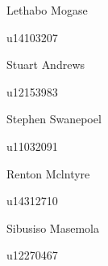 \documentclass[hidelinks,a4paper,12pt]{article}
\begin{document}
\begin{titlepage}
\begin{center}
				\begin{minipage}{0.4\textwidth}
					\begin{flushleft} \large
						Lethabo {Mogase}
					\end{flushleft}
				\end{minipage}
				\begin{minipage}{0.4\textwidth}
					\begin{flushright} \large
						\emph{}
						u14103207
					\end{flushright}
				\end{minipage}
				
				\begin{minipage}{0.4\textwidth}
					\begin{flushleft} \large
						Stuart {Andrews}
					\end{flushleft}
				\end{minipage}
				\begin{minipage}{0.4\textwidth}
					\begin{flushright} \large
						\emph{}
						u12153983
					\end{flushright}
				\end{minipage}
				
				\begin{minipage}{0.4\textwidth}
					\begin{flushleft} \large
						Stephen {Swanepoel}
					\end{flushleft}
				\end{minipage}
				\begin{minipage}{0.4\textwidth}
					\begin{flushright} \large
						\emph{}
						u11032091
					\end{flushright}
				\end{minipage}
				
				\begin{minipage}{0.4\textwidth}
					\begin{flushleft} \large
						Renton {Mclntyre}
					\end{flushleft}
				\end{minipage}
				\begin{minipage}{0.4\textwidth}
					\begin{flushright} \large
						\emph{}
						u14312710
					\end{flushright}
				\end{minipage}
				
				\begin{minipage}{0.4\textwidth}
					\begin{flushleft} \large
						Sibusiso {Masemola}
					\end{flushleft}
				\end{minipage}
				\begin{minipage}{0.4\textwidth}
					\begin{flushright} \large
						\emph{}
						u12270467
					\end{flushright}
				\end{minipage}
				
				
				\vfill

			\end{center}
		\end{titlepage}
\end{document}
